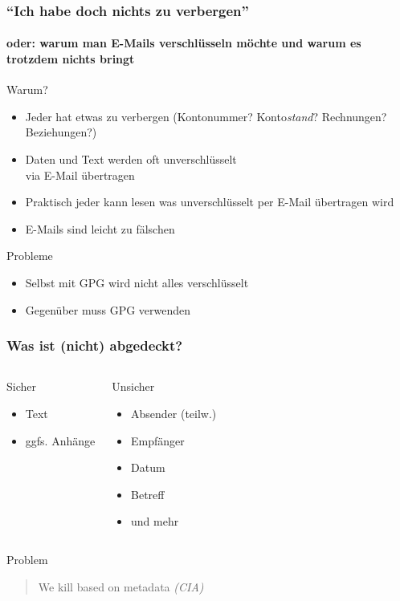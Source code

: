 \documentclass{beamer}
\begin{document}
\begin{frame}
  \frametitle{``Ich habe doch nichts zu verbergen''}
  \framesubtitle{oder: warum man E-Mails verschlüsseln möchte und warum es trotzdem nichts bringt}

  \begin{block}{Warum?}
    \begin{itemize}
    \item Jeder hat etwas zu verbergen (Kontonummer? Konto\emph{stand}?
      Rechnungen? Beziehungen?)
    \item Daten und Text werden oft unverschlüsselt\\via E-Mail übertragen
    \small
    \item Praktisch jeder kann lesen was unverschlüsselt per E-Mail übertragen
      wird
    \item E-Mails sind leicht zu fälschen
    \end{itemize}
  \end{block}
  \pause
  \begin{block}{Probleme}
    \begin{itemize}
    \item Selbst mit GPG wird nicht alles verschlüsselt
    \item Gegenüber muss GPG verwenden
    \end{itemize}
  \end{block}
\end{frame}

\begin{frame}
  \frametitle{Was ist (nicht) abgedeckt?}
  \begin{columns}
    \begin{block}{Sicher}
      \begin{itemize}
      \item Text
      \item ggfs. Anhänge
      \end{itemize}
    \end{block}
    \begin{block}{Unsicher}
      \begin{itemize}
      \item Absender (teilw.)
      \item Empfänger
      \item Datum
      \item Betreff
      \item und mehr
      \end{itemize}
    \end{block}
  \end{columns}
  \pause
  \begin{block}{Problem}
    \begin{quote}
      We kill based on metadata \emph{(CIA)}
    \end{quote}
  \end{block}
\end{frame}
\end{document}

